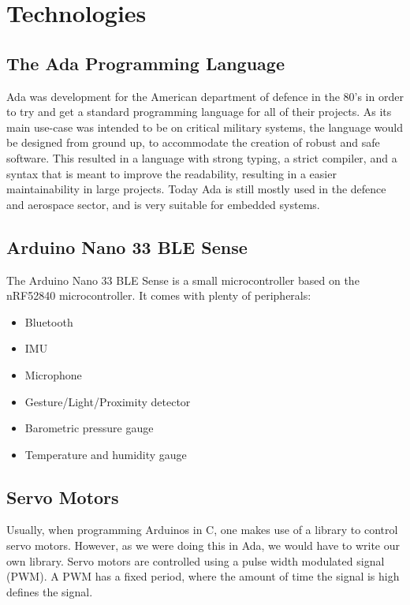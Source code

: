 \documentclass{article}
\begin{document}
\section{Technologies}

\subsection{The Ada Programming Language}
Ada was development for the American department of defence in the 80's in order to try and get a standard programming language for all of their projects. As its main use-case was intended to be on critical military systems, the language would be designed from ground up, to accommodate the creation of robust and safe software. This resulted in a language with strong typing, a strict compiler, and a syntax that is meant to improve the readability, resulting in a easier maintainability in large projects. Today Ada is still mostly used in the defence and aerospace sector, and is very suitable for embedded systems.\\


\subsection{Arduino Nano 33 BLE Sense}

The Arduino Nano 33 BLE Sense is a small microcontroller based on the nRF52840 microcontroller.
It comes with plenty of peripherals:
\begin{itemize}
  \item Bluetooth
  \item IMU
  \item Microphone
  \item Gesture/Light/Proximity detector
  \item Barometric pressure gauge
  \item Temperature and humidity gauge
\end{itemize}

\subsection{Servo Motors}
Usually, when programming Arduinos in C, one makes use of a library to control servo motors. However, as we were doing this in Ada, we would have to write our own library. Servo motors are controlled using a pulse width modulated signal (PWM). A PWM has a fixed period, where the amount of time the signal is high defines the signal.
\end{document}
